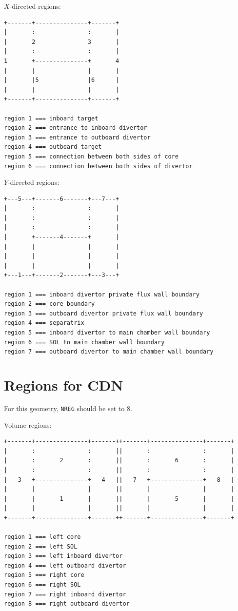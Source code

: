 \documentclass[a4paper,10pt]{report}
\begin{document}
$X$-directed regions:
\begin{verbatim}
+-------+---------------+-------+
|       :               :       |
|       2               3       |
|       :               :       |
1       +---------------+       4
|       |               |       |
|       |5              |6      |
|       |               |       |
+-------+---------------+-------+

region 1 === inboard target
region 2 === entrance to inboard divertor
region 3 === entrance to outboard divertor
region 4 === outboard target
region 5 === connection between both sides of core
region 6 === connection between both sides of divertor
\end{verbatim}

\clearpage
$Y$-directed regions:
\begin{verbatim}
+---5---+-------6-------+---7---+
|       :               :       |
|       :               :       |
|       :               :       |
|       +-------4-------+       |
|       |               |       |
|       |               |       |
|       |               |       |
+---1---+-------2-------+---3---+

region 1 === inboard divertor private flux wall boundary
region 2 === core boundary
region 3 === outboard divertor private flux wall boundary
region 4 === separatrix
region 5 === inboard divertor to main chamber wall boundary
region 6 === SOL to main chamber wall boundary
region 7 === outboard divertor to main chamber wall boundary
\end{verbatim}

\clearpage
\section{Regions for CDN}

For this geometry, {\tt NREG} should be set to $8$.

Volume regions:
\begin{verbatim}
+-------+---------------+-------++-------+---------------+-------+
|       :               :       ||       :               :       |
|       :       2       :       ||       :       6       :       |
|       :               :       ||       :               :       |
|   3   +---------------+   4   ||   7   +---------------+   8   |
|       |               |       ||       |               |       |
|       |       1       |       ||       |       5       |       |
|       |               |       ||       |               |       |
+-------+---------------+-------++-------+---------------+-------+

region 1 === left core
region 2 === left SOL
region 3 === left inboard divertor
region 4 === left outboard divertor
region 5 === right core
region 6 === right SOL
region 7 === right inboard divertor
region 8 === right outboard divertor
\end{verbatim}
\end{document}
